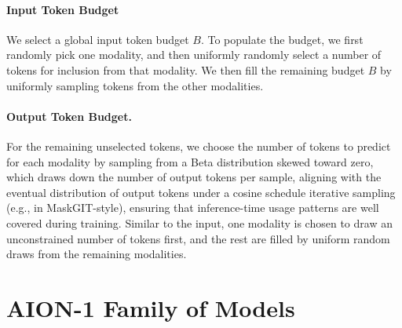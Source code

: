 \documentclass[]{polymathic}
\begin{document}
\paragraph{Input Token Budget} We select a global input token budget \(B\). To populate the budget, we first randomly pick one modality, and then uniformly randomly select a number of tokens for inclusion from that modality. We then fill the remaining budget $B$ by uniformly sampling tokens from the other modalities.

\paragraph{Output Token Budget.} For the remaining unselected tokens, we choose the number of tokens to predict for each modality by sampling from a Beta distribution skewed toward zero, which draws down the number of output tokens per sample, aligning with the eventual distribution of output tokens under a cosine schedule iterative sampling (e.g., in MaskGIT-style), ensuring that inference-time usage patterns are well covered during training. Similar to the input, one modality is chosen to draw an unconstrained number of tokens first, and the rest are filled by uniform random draws from the remaining modalities.


\section{AION-1 Family of Models}
\label{sec:aion-model}
\end{document}
